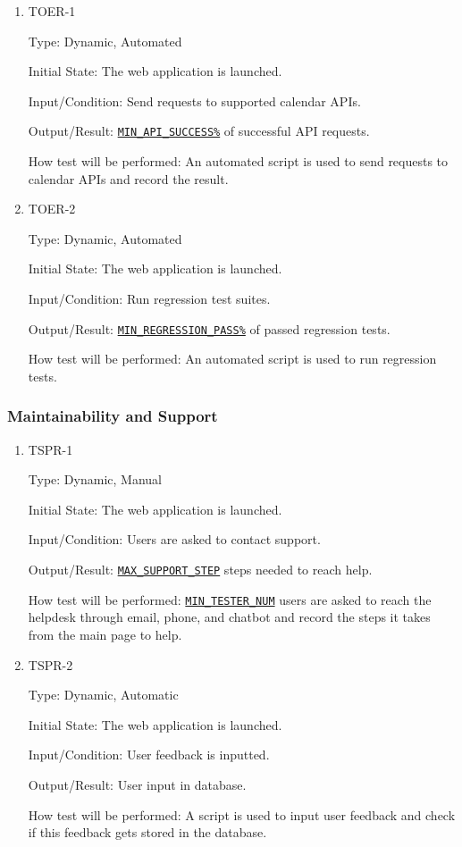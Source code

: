 \documentclass[12pt, titlepage]{article}
\begin{document}
\begin{enumerate}
\item{TOER-1\\}\label{TOER-1}

Type: Dynamic, Automated
					
Initial State: The web application is launched.
					
Input/Condition: Send requests to supported calendar APIs.
					
Output/Result: \hyperref[MIN_API_SUCCESS]{\texttt{MIN\_API\_SUCCESS\%}} of successful API requests.
					
How test will be performed: An automated script is used to send requests to calendar APIs and record the result.


\item{TOER-2\\}\label{TOER-2}

Type: Dynamic, Automated
					
Initial State: The web application is launched.
					
Input/Condition: Run regression test suites.
					
Output/Result: \hyperref[MIN_REGRESSION_PASS]{\texttt{MIN\_REGRESSION\_PASS\%}} of passed regression tests.
					
How test will be performed: An automated script is used to run regression tests.

\end{enumerate}
\subsubsection{Maintainability and Support}

\begin{enumerate}
\item{TSPR-1\\}\label{TSPR-1}

Type: Dynamic, Manual
					
Initial State: The web application is launched.
					
Input/Condition: Users are asked to contact support.
					
Output/Result: \hyperref[MAX_SUPPORT_STEP]{\texttt{MAX\_SUPPORT\_STEP}} steps needed to reach help.
					
How test will be performed: \hyperref[MIN_TESTER_NUM]{\texttt{MIN\_TESTER\_NUM}} users are asked to reach the helpdesk through email, phone, and chatbot and record the steps it takes from the main page to help.


\item{TSPR-2\\}\label{TSPR-2}

Type: Dynamic, Automatic
					
Initial State: The web application is launched.
					
Input/Condition: User feedback is inputted.
					
Output/Result: User input in database.
					
How test will be performed: A script is used to input user feedback and check if this feedback gets stored in the database.

\end{enumerate}
\end{document}
